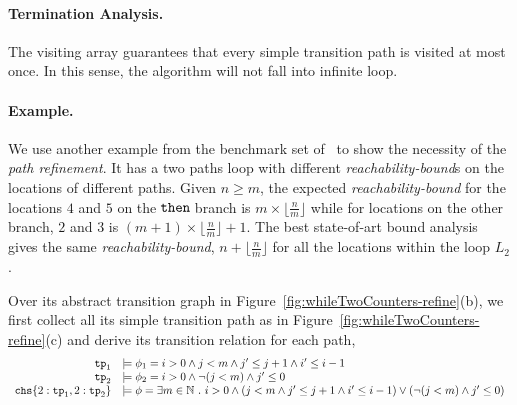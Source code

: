 \paragraph{Termination Analysis.}
The visiting array guarantees that every simple transition path is visited at most once.
In this sense, the algorithm will not fall into infinite loop.

\paragraph{Example.}
We use another example from the benchmark set of~\cite{GulwaniJK09} to show the necessity of the \emph{path refinement}. 
It has a two paths loop
with different \emph{reachability-bound}s on the locations of different paths.
%
Given $n \geq m$,
the expected \emph{reachability-bound} for the locations $4$ and $5$ on the$\mathtt{\;then\;}$branch is $m \times \lfloor\frac{n}{m}\rfloor$
while for locations on the other branch, $2$ and $3$ is $(m + 1) \times \lfloor\frac{n}{m}\rfloor + 1$. 
The best state-of-art bound analysis
gives the same \emph{reachability-bound}, $n + \lfloor\frac{n}{m}\rfloor$ for all the locations within the loop $L_2$.


Over its abstract transition graph in Figure~\ref{fig:whileTwoCounters-refine}(b), we first collect all its simple transition path as in Figure~\ref{fig:whileTwoCounters-refine}(c) and derive its transition relation for each path,
\[
   \begin{array}{rl}
   \tpath_1 & \models \phi_1 =  i> 0 \land j < m \land j' \leq j + 1 \land i' \leq i - 1\\
   \tpath_2 & \models  \phi_2 =  i> 0 \land \neg(j < m) \land j' \leq 0 \\
   \rpchoose{2: \tpath_1, 2: \tpath_2} & \models \phi = \exists m \in \mathbb{N} \st i > 0 \land (j < m \land j' \leq j + 1 \land i' \leq i - 1) \lor (\neg(j < m) \land j' \leq 0)
   \end{array}
\]


